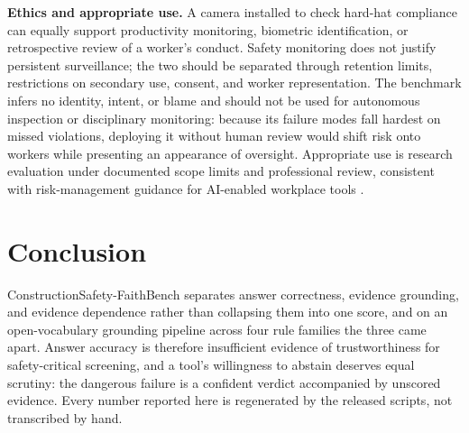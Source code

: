 \documentclass[12pt,letterpaper]{article}
\begin{document}
\textbf{Ethics and appropriate use.} A camera installed to check hard-hat compliance can equally support productivity monitoring, biometric identification, or retrospective review of a worker's conduct. Safety monitoring does not justify persistent surveillance; the two should be separated through retention limits, restrictions on secondary use, consent, and worker representation. The benchmark infers no identity, intent, or blame and should not be used for autonomous inspection or disciplinary monitoring: because its failure modes fall hardest on missed violations, deploying it without human review would shift risk onto workers while presenting an appearance of oversight. Appropriate use is research evaluation under documented scope limits and professional review, consistent with risk-management guidance for AI-enabled workplace tools \citep{nist2023airmf,howard2024workplace}.

\section{Conclusion}

ConstructionSafety-FaithBench separates answer correctness, evidence grounding, and evidence dependence rather than collapsing them into one score, and on an open-vocabulary grounding pipeline across four rule families the three came apart. Answer accuracy is therefore insufficient evidence of trustworthiness for safety-critical screening, and a tool's willingness to abstain deserves equal scrutiny: the dangerous failure is a confident verdict accompanied by unscored evidence. Every number reported here is regenerated by the released scripts, not transcribed by hand.

\label{bodyend}
\clearpage

\begingroup

\small




\endgroup
\end{document}
